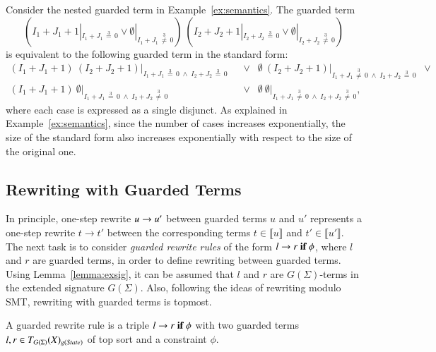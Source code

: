 \begin{example}
Consider the nested guarded term in Example~\ref{ex:semantics}. The guarded term
\[
(I_1 + J_1 + 1 |_{I_1 + J_1 \,\stackrel{3}{=}\, 0} \vee \emptyset |_{I_1 + J_1 \,\stackrel{3}{\not=}\, 0})\ (I_2 + J_2 + 1 |_{I_2 + J_2 \,\stackrel{3}{=}\, 0} \vee \emptyset |_{I_2 + J_2 \,\stackrel{3}{\not=}\, 0})
\]
is equivalent to the following guarded term in the standard form:
\begin{align*}
  (I_1 + J_1 + 1)\ (I_2 + J_2 + 1) |_{I_1 + J_1 \,\stackrel{3}{=}\, 0 \;\wedge\; I_2 + J_2 \,\stackrel{3}{=}\, 0} &\;\;\vee\;\; \emptyset\ (I_2 + J_2 + 1) |_{I_1 + J_1 \,\stackrel{3}{\not=}\, 0 \;\wedge\; I_2 + J_2 \,\stackrel{3}{=}\, 0}
  \;\;\vee \\
   (I_1 + J_1 + 1)\ \emptyset |_{I_1 + J_1 \,\stackrel{3}{=}\, 0 \;\wedge\; I_2 + J_2 \,\stackrel{3}{\not=}\, 0}  &\;\;\vee\;\; \emptyset\ \emptyset |_{I_1 + J_1 \,\stackrel{3}{\not =}\, 0 \;\wedge\; I_2 + J_2 \,\stackrel{3}{\not =}\, 0},
\end{align*}
where each case is expressed as a single disjunct.  As explained in
Example~\ref{ex:semantics}, since the number of cases increases
exponentially, the size of the standard form also increases
exponentially with respect to the size of the original one.
\end{example}

\subsection{Rewriting with Guarded Terms}
\label{sec:guarded-rew}

In principle, one-step rewrite $u \rightarrow u'$ between guarded terms $u$
and $u'$ represents a one-step rewrite $t \to t'$ between the
corresponding terms $t \in \llbracket u \rrbracket$ and $t' \in
\llbracket u' \rrbracket$.
%
The next task is to consider \emph{guarded rewrite rules} of the form
$l \rightarrow r\;\textnormal{\bf if}\; {\phi}$, where $l$ and $r$ are guarded terms, in order to
define rewriting between guarded terms.
%
Using Lemma~\ref{lemma:exsig}, it can be assumed that $l$ and $r$ are
$G(\Sigma)$-terms in the extended signature $G(\Sigma)$.
%
Also, following the ideas of rewriting modulo SMT, rewriting with
guarded terms is topmost.
%

\begin{definition}
A guarded rewrite rule is a triple $l \rightarrow r\;\textnormal{\bf if}\; {\phi}$ with two guarded
terms $l, r \in T_{G(\Sigma)}(X)_{g(\textit{State})}$ of top sort
 and a constraint $\phi$.
\end{definition}

